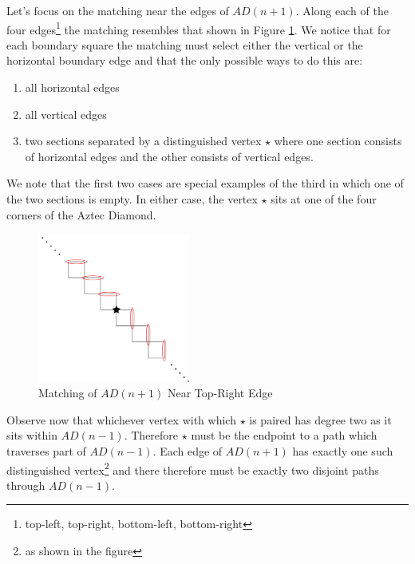 \documentclass{article}
\begin{document}
Let's focus on the matching near the edges of $AD(n+1)$. Along each of the four edges\footnote{top-left, top-right, bottom-left, bottom-right} the matching resembles that shown in Figure \ref{fig:edge_match}. We notice that for each boundary square the matching must select either the vertical or the horizontal boundary edge and that the only possible ways to do this are: 
\begin{center}
\begin{minipage}{.7\textwidth}
\begin{enumerate}
\item all horizontal edges

\item all vertical edges

\item two sections separated by a distinguished vertex $\star$ where one section consists of horizontal edges and the other consists of vertical edges. 
\end{enumerate}
\end{minipage}
\end{center}
We note that the first two cases are special examples of the third in which one of the two sections is empty. In either case, the vertex $\star$ sits at one of the four corners of the Aztec Diamond. 

\begin{figure}[htb!]
	\begin{center}
 	\includegraphics[width=5cm]{edge_match.png}
  	\caption{Matching of $AD(n+1)$ Near Top-Right Edge}
	 \label{fig:edge_match}
 	 \end{center}
\end{figure} 

Observe now that whichever vertex with which $\star$ is paired has degree two as it sits within $AD(n-1)$. Therefore $\star$ must be the endpoint to a path which traverses part of $AD(n-1)$. Each edge of $AD(n+1)$ has exactly one such distinguished vertex\footnote{as shown in the figure} and there therefore must be exactly two disjoint paths through $AD(n-1)$. 
\end{document}
